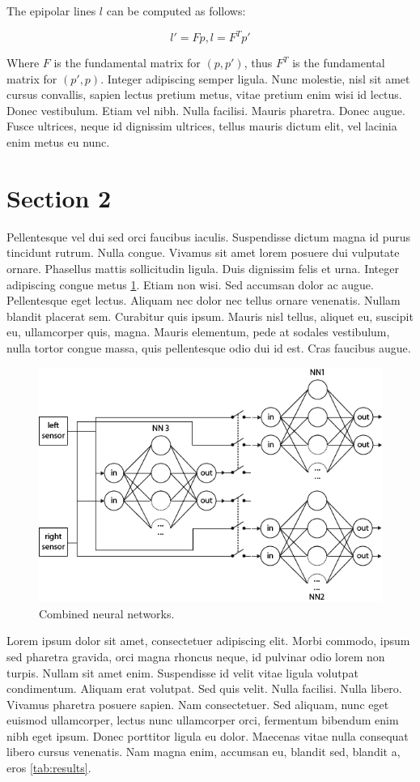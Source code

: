 The epipolar lines $l$ can be computed as follows:

\[l'=Fp, l=F^{T}p'\]

Where $F$ is the fundamental matrix for $(p, p')$, thus $F^{T}$ is the fundamental matrix for $(p',p)$. Integer adipiscing semper ligula. Nunc molestie, nisl sit amet cursus convallis, sapien lectus pretium metus, vitae pretium enim wisi id lectus. Donec vestibulum. Etiam vel nibh. Nulla facilisi. Mauris pharetra. Donec augue. Fusce ultrices, neque id dignissim ultrices, tellus mauris dictum elit, vel lacinia enim metus eu nunc.

\section{Section 2}
Pellentesque vel dui sed orci faucibus iaculis. Suspendisse dictum magna id purus tincidunt rutrum. Nulla congue. Vivamus sit amet lorem posuere dui vulputate ornare. Phasellus mattis sollicitudin ligula. Duis dignissim felis et urna. Integer adipiscing congue metus \ref{fig:combinedneuralnetworks}. Etiam non wisi. Sed accumsan dolor ac augue. Pellentesque eget lectus. Aliquam nec dolor nec tellus ornare venenatis. Nullam blandit placerat sem. Curabitur quis ipsum. Mauris nisl tellus, aliquet eu, suscipit eu, ullamcorper quis, magna. Mauris elementum, pede at sodales vestibulum, nulla tortor congue massa, quis pellentesque odio dui id est. Cras faucibus augue.

\begin{figure}[H]
    \centering
    \includegraphics[width=.8\linewidth]{images/figure3.png}
    \caption{Combined neural networks.}\label{fig:combinedneuralnetworks}
\end{figure}

Lorem ipsum dolor sit amet, consectetuer adipiscing elit. Morbi commodo, ipsum sed pharetra gravida, orci magna rhoncus neque, id pulvinar odio lorem non turpis. Nullam sit amet enim. Suspendisse id velit vitae ligula volutpat condimentum. Aliquam erat volutpat. Sed quis velit. Nulla facilisi. Nulla libero. Vivamus pharetra posuere sapien. Nam consectetuer. Sed aliquam, nunc eget euismod ullamcorper, lectus nunc ullamcorper orci, fermentum bibendum enim nibh eget ipsum. Donec porttitor ligula eu dolor. Maecenas vitae nulla consequat libero cursus venenatis. Nam magna enim, accumsan eu, blandit sed, blandit a, eros \ref{tab:results}.

